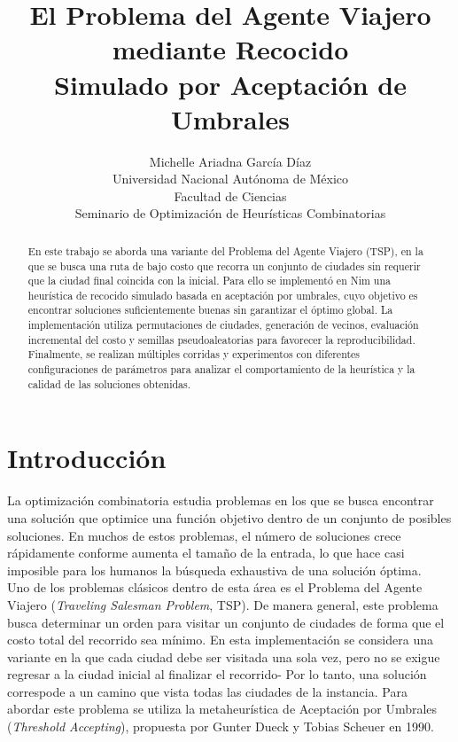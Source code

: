 \documentclass[twoside,11pt]{article}
\begin{document}
\title{
El Problema del Agente Viajero mediante Recocido \\ Simulado por Aceptación de Umbrales
}

\author{
    \name Michelle Ariadna García Díaz \\
    \addr Universidad Nacional Autónoma de México \\
    Facultad de Ciencias \\
    Seminario de Optimización de Heurísticas Combinatorias
}

\editor{}

\maketitle

\begin{abstract}
En este trabajo se aborda una variante del Problema del Agente Viajero (TSP), en la que se busca una ruta de bajo costo que recorra un conjunto de ciudades sin requerir que la ciudad final coincida con la inicial. Para ello se implementó en Nim una heurística de recocido simulado basada en aceptación por umbrales, cuyo objetivo es encontrar soluciones suficientemente buenas sin garantizar el óptimo global. La implementación utiliza permutaciones de ciudades, generación de vecinos, evaluación incremental del costo y semillas pseudoaleatorias para favorecer la reproducibilidad. Finalmente, se realizan múltiples corridas y experimentos con diferentes configuraciones de parámetros para analizar el comportamiento de la heurística y la calidad de las soluciones obtenidas.

\end{abstract}



\section{Introducción}
La optimización combinatoria estudia problemas en los que se busca encontrar una solución que optimice una función objetivo dentro de un conjunto de posibles soluciones. En muchos de estos problemas, el número de soluciones crece rápidamente conforme aumenta el tamaño de la entrada, lo que hace casi imposible para los humanos la búsqueda exhaustiva de una solución óptima. \\

Uno de los problemas clásicos dentro de esta área es el Problema del Agente Viajero (\textit{Traveling Salesman Problem}, TSP). De manera general, este problema busca determinar un orden para visitar un conjunto de ciudades de forma que el costo total del recorrido sea mínimo. En esta implementación se considera una variante en la que cada ciudad debe ser visitada una sola vez, pero no se exigue regresar a la ciudad inicial al finalizar el recorrido- Por lo tanto, una solución correspode a un camino que vista todas las ciudades de la instancia. Para abordar este problema se utiliza la metaheurística de Aceptación por Umbrales (\textit{Threshold Accepting}), propuesta por Gunter Dueck y Tobias
Scheuer en 1990. \\
\end{document}
